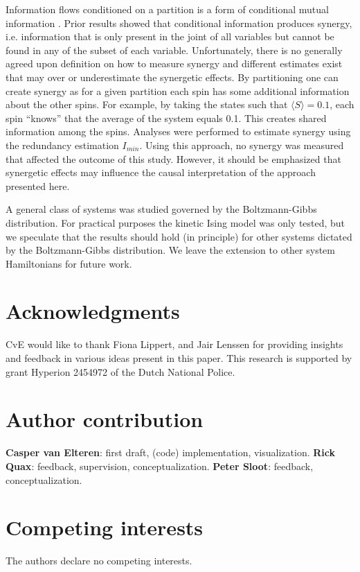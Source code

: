 \documentclass[a4paper, 11pt, twocolumn]{article}
\begin{document}
Information flows  conditioned on a  partition is a  form of
conditional   mutual   information  \cite{James2016a}.   Prior
results   showed  that   conditional  information   produces
synergy, i.e. information that is  only present in the joint
of all variables but cannot be found in any of the subset of
each variable.  Unfortunately, there is no  generally agreed
upon    definition    on     how    to    measure    synergy
\cite{Beer2015,Kolchinsky2022}  and different  estimates exist
that may  over or  underestimate the synergetic  effects. By
partitioning one can create synergy as for a given partition
each spin  has some  additional information about  the other
spins. For example, by taking the states such that \(\langle S \rangle =
0.1\),  each spin  ``knows'' that  the average  of the  system
equals 0.1. This creates shared information among the spins.
Analyses  were  performed  to  estimate  synergy  using  the
redundancy  estimation  \(I_{min}\)\cite{Williams2010}.  Using
this  approach, no  synergy was  measured that  affected the
outcome of this study. However, it should be emphasized that
synergetic effects  may influence the  causal interpretation
of the approach presented here.

A  general class  of  systems was  studied  governed by  the
Boltzmann-Gibbs  distribution.  For practical  purposes  the
kinetic Ising model  was only tested, but  we speculate that
the  results should  hold (in  principle) for  other systems
dictated by  the Boltzmann-Gibbs distribution. We  leave the
extension to other system Hamiltonians for future work.

\section{Acknowledgments}
\label{sec:orgf30530a}
CvE would like to thank  Fiona Lippert, and Jair Lenssen for
providing insights and feedback  in various ideas present in
this  paper. This  research is  supported by  grant Hyperion
2454972 of the Dutch National Police.

\section{Author contribution}
\label{sec:org4c5c80d}
\textbf{Casper  van Elteren}:  first  draft, (code)  implementation,
 visualization.    \textbf{Rick   Quax}:   feedback,   supervision,
 conceptualization. \textbf{Peter Sloot}:    feedback,
 conceptualization.


\section{Competing interests}
\label{sec:org5e79684}
The authors declare no competing interests.
\end{document}
